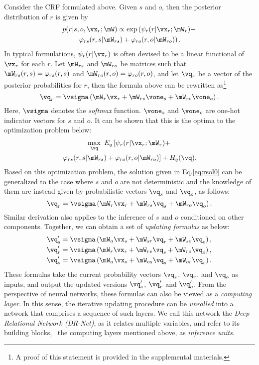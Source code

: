 \documentclass[10pt,twocolumn,letterpaper]{article}
\begin{document}
Consider the CRF formulated above. 
Given $s$ and $o$, then the posterior distribution of $r$ is given by
\begin{multline}
	p(r | s, o, \vx_r; \mW) \propto \exp \left(
		\psi_r(r | \vx_r; \mW_r) + \right. \\
		\left. \varphi_{rs}(r, s | \mW_{rs}) 
		+ \varphi_{ro}(r, o | \mW_{ro})
	\right).
\end{multline}
In typical formulations, 
$\psi_r(r | \vx_r)$ is often devised to be a linear functional of $\vx_r$ for each $r$.
Let $\mW_{rs}$ and $\mW_{ro}$ be matrices such that
$\mW_{rs}(r, s) = \varphi_{rs}(r, s)$ and 
$\mW_{ro}(r, o) = \varphi_{ro}(r, o)$, and
let $\vq_r$ be a vector of the posterior probabilities for $r$, then
the formula above can be rewritten 
as\footnote{A proof of this statement is provided in the supplemental materials.}\begin{equation} \label{eq:rsol0}
	\vq_r = \vsigma \left(
		\mW_r \vx_r + \mW_{rs} \vone_s + \mW_{ro} \vone_o
	\right).	
\end{equation}
Here, $\vsigma$ denotes the \emph{softmax} function.
$\vone_s$ and $\vone_o$ are one-hot indicator vectors for $s$ and $o$.
It can be shown that this is the optima to the optimization problem below:
\begin{multline}
	\max_\vq \ E_q \left[ \psi_r(r | \vx_r; \mW_r) + \right. \\
	\left. \varphi_{rs}(r, s | \mW_{rs}) + \varphi_{ro}(r, o | \mW_{ro}) \right] + H_q(\vq).
\end{multline}
Based on this optimization problem, the solution given in Eq.\eqref{eq:rsol0} can be 
generalized to the case where $s$ and $o$ are not deterministic and 
the knowledge of them are instead given by probabilistic vectors $\vq_s$ and $\vq_o$, as follows:
\begin{equation} \label{eq:rso}
	\vq_r = \vsigma \left(
		\mW_r \vx_r + \mW_{rs} \vq_s + \mW_{ro} \vq_o
	\right).	
\end{equation}
Similar derivation also applies to the inference of $s$ and $o$ conditioned on other components. 
Together, we can obtain a set of \emph{updating formulas} as below:
\begin{align} \label{eq:runit}
        \vq'_s & = \vsigma \left( \mW_a \vx_s + \mW_{sr} \vq_r + \mW_{so} \vq_o \right), \notag \\
        \vq'_r & = \vsigma \left( \mW_r \vx_r + \mW_{rs} \vq_s + \mW_{ro} \vq_o \right), \notag \\
        \vq'_o & = \vsigma \left( \mW_a \vx_o + \mW_{os} \vq_s + \mW_{or} \vq_r \right).
\end{align}%
These formulas take the current probability vectors $\vq_s$, $\vq_r$, and $\vq_o$ as inputs, and
output the updated versions $\vq'_s$, $\vq'_r$ and $\vq'_o$. 
From the perspective of neural networks, these formulas can also be viewed as a \emph{computing layer}. 
In this sense, the iterative updating procedure can be \emph{unrolled} into a network that comprises 
a sequence of such layers. 
We call this network the \emph{Deep Relational Network (DR-Net)}, as it relates multiple variables, and
refer to its building blocks, \ie~the computing layers mentioned above, as \emph{inference units}.
\end{document}
